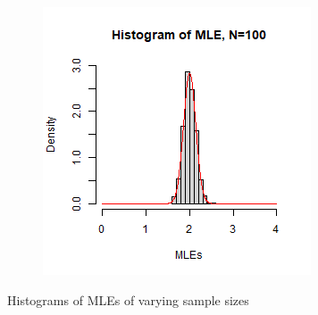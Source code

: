 \begin{figure}[h]
\begin{subfigure}
    \end{subfigure}
    \begin{subfigure}
        \centering
        \includegraphics[scale=0.45]{../../../misc/N100.jpg}
    \end{subfigure}
	\caption{Histograms of MLEs of varying sample sizes}
	\label{hist}
\end{figure}
